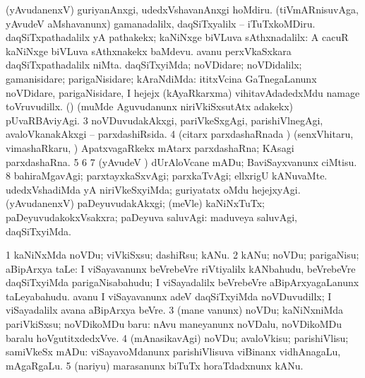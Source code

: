 {{{{{{\noindent 
\gl{\pagu}
\expl{}
\bmng
\bnum
{}  
\banum
{} (yAvudanenxV) guriyanAnxgi, udedxVshavanAnxgi hoMdiru. 
 (tiVmARnisuvAga, yAvudeV aMshavanunx) gamanadalilx, daqSiTxyalilx -- iTuTxkoMDiru. 
\eanum
\numie
{}  
\banum
{} daqSiTxpathadalilx yA pathakekx; kaNiNxge biVLuva sAthxnadalilx:  A cacuR kaNiNxge biVLuva sAthxnakekx baMdevu.  avanu perxVkaSxkara daqSiTxpathadalilx niMta. 
 daqSiTxyiMda; noVDidare; noVDidalilx; gamanisidare; parigaNisidare; kAraNdiMda:  ititxVcina GaTnegaLanunx noVDidare, parigaNisidare, I hejejx (kAyaRkarxma) vihitavAdadedxMdu namage toVruvudillx. 
 (\pArxparx) (muMde Aguvudanunx niriVkiSxsutAtx adakekx) pUvaRBAviyAgi. 
\eanum
\numie
\num{3}  noVDuvudakAkxgi, pariVkeSxgAgi, parishiVlnegAgi, avaloVkanakAkxgi -- parxdashiRsida. 
\num{4}  (citarx parxdashaRnada \vi) (senxVhitaru, vimashaRkaru, \mo) ApatxvagaRkekx mAtarx parxdashaRna; KAsagi parxdashaRna. 
\num{5}  
\num{6}  
\num{7}  (yAvudeV \vi) dUrAloVcane mADu; BaviSayxvanunx ciMtisu. 
\num{8}  bahiraMgavAgi; parxtayxkaSxvAgi; parxkaTvAgi; ellxrigU kANuvaMte. 
  
\banum
{} udedxVshadiMda yA niriVkeSxyiMda; guriyatatx oMdu hejejxyAgi. 
 (yAvudanenxV) paDeyuvudakAkxgi; (meVle) kaNiNxTuTx; paDeyuvudakokxVsakxra; paDeyuva saluvAgi:  maduveya saluvAgi, daqSiTxyiMda. 
\eanum
\numie
\enum
\emng
\eentry

\bentry 
{} 
\gl{\sakirx}
\expl{}
\bmng
\bnum
\num{1} kaNiNxMda noVDu; viVkiSxsu; dashiRsu; kANu. 
\num{2} kANu; noVDu; parigaNisu; aBipArxya taLe:  I viSayavanunx beVrebeVre riVtiyalilx kANbahudu, beVrebeVre daqSiTxyiMda parigaNisabahudu; I viSayadalilx beVrebeVre aBipArxyagaLanunx taLeyabahudu.  avanu I viSayavanunx adeV daqSiTxyiMda noVDuvudillx; I viSayadalilx avana aBipArxya beVre. 
\num{3} (mane \mo vanunx) noVDu; kaNiNxniMda pariVkiSxsu; noVDikoMDu baru:  nAvu maneyanunx noVDalu, noVDikoMDu baralu hoVgutitxdedxVve. 
\num{4} (mAnasikavAgi) noVDu; avaloVkisu; parishiVlisu; samiVkeSx mADu:  viSayavoMdanunx parishiVlisuva viBinanx vidhAnagaLu, mAgaRgaLu. 
\num{5} (nariyu) marasanunx biTuTx horaTdadxnunx kANu. 
\enum
\emng

}}}}}}
